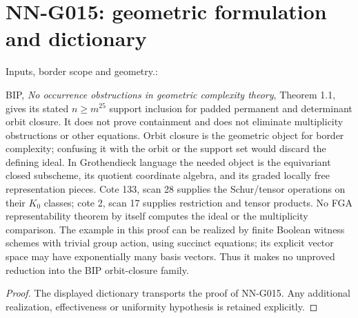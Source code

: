 \section{NN-G015: geometric formulation and dictionary}
\begin{geometricstatement}[NN-G015]
Inputs, border scope and geometry.:

BIP, \emph{No occurrence obstructions in geometric
complexity theory}, Theorem 1.1, gives its stated
$n\ge m^{25}$ support inclusion for padded permanent
and determinant orbit closure. It does not prove
containment and does not eliminate multiplicity
obstructions or other equations. Orbit closure is the
geometric object for border complexity; confusing it
with the orbit or the support set would discard the
defining ideal. In Grothendieck language the needed
object is the equivariant closed subscheme, its
quotient coordinate algebra, and its graded locally
free representation pieces. Cote 133, scan 28 supplies
the Schur/tensor operations on their $K_0$ classes;
cote 2, scan 17 supplies restriction and tensor products.
No FGA representability theorem by itself computes the
ideal or the multiplicity comparison. The example in
this proof can be realized by finite Boolean witness
schemes with trivial group action, using succinct
equations; its explicit vector space may have
exponentially many basis vectors. Thus it makes no
unproved reduction into the BIP orbit-closure family.


\end{geometricstatement}
\begin{proof} The displayed dictionary transports the proof of NN-G015. Any additional realization, effectiveness or uniformity hypothesis is retained explicitly.\end{proof}


